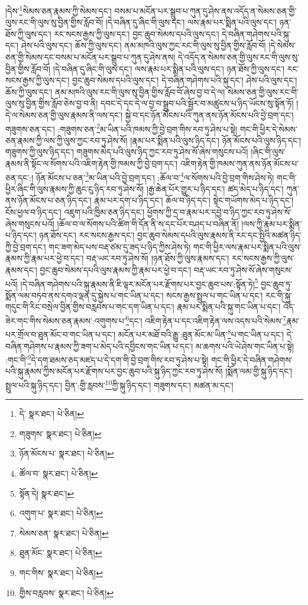 །དེས་\footnote{དེ་  སྣར་ཐང་།  པེ་ཅིན། }སེམས་ཅན་རྣམས་ཀྱི་སེམས་དང་། བསམ་པ་མངོན་པར་སྒྲུབ་པ་ཀུན་དུ་ཤེས་ནས་འདོད་ན་སེམས་ཅན་གྱི་ལུས་རང་གི་ལུས་སུ་བྱིན་གྱིས་རློབ་བོ། །དེ་བཞིན་དུ་ཞིང་གི་ལུས་དང་། ལས་རྣམ་པར་སྨིན་པའི་ལུས་དང་། ཉན་ཐོས་ཀྱི་ལུས་དང་། རང་སངས་རྒྱས་ཀྱི་ལུས་དང་། བྱང་ཆུབ་སེམས་དཔའི་ལུས་དང་། དེ་བཞིན་གཤེགས་པའི་སྐུ་དང་། ཤེས་པའི་ལུས་དང་། ཆོས་ཀྱི་ལུས་དང་། ནམ་མཁའི་ལུས་ཀྱང་རང་གི་ལུས་སུ་བྱིན་གྱིས་རློབ་བོ། །དེ་སེམས་ཅན་གྱི་སེམས་དང་བསམ་པ་མངོན་པར་སྒྲུབ་པ་ཀུན་དུ་ཤེས་ནས། དེ་འདོད་ན་སེམས་ཅན་གྱི་ལུས་རང་གི་ལུས་སུ་བྱིན་གྱིས་རློབ་བོ། །དེ་བཞིན་དུ་ཞིང་གི་ལུས་དང་། ལས་རྣམ་པར་སྨིན་པའི་ལུས་དང་། ཉན་ཐོས་ཀྱི་ལུས་དང་། རང་སངས་རྒྱས་ཀྱི་ལུས་དང་། བྱང་ཆུབ་སེམས་དཔའི་ལུས་དང་། དེ་བཞིན་གཤེགས་པའི་སྐུ་དང་། ཤེས་པའི་ལུས་དང་། ཆོས་ཀྱི་ལུས་དང་། ནམ་མཁའི་ལུས་རང་གི་ལུས་སུ་བྱིན་གྱིས་རློབ་བོ་ཞེས་བྱ་བ་དེ་ལ། སེམས་ཅན་གྱི་ལུས་རང་གི་ལུས་སུ་བྱིན་གྱིས་རློབ་ཅེས་བྱ་བ་ནི། དབང་དེ་དང་དེ་ལ་བྱ་བ་སྒྲུབ་པའི་སྦྱོར་བ་མཚུངས་པ་ཉིད་ཡོངས་སུ་སྟོན་ཏོ། །དེ་ལ་སེམས་ཅན་གྱི་ལུས་རྣམས་ནི་ལས་དང་། སྐྱེ་བ་དང་ཉོན་མོངས་པའི་ཀུན་ནས་ཉོན་མོངས་པའི་བྱེ་བྲག་དང་། གཟུགས་ཅན་དང་། :གཟུགས་ཅན་\footnote{གཟུགས་  སྣར་ཐང་།  པེ་ཅིན། }མ་ཡིན་པའི་ཁམས་ཀྱི་བྱེ་བྲག་གིས་རབ་ཏུ་ཤེས་པ་སྟེ། གང་གི་ཕྱིར་དེ་སེམས་ཅན་རྣམས་ཀྱི་ལས་ཀྱི་ལུས་ཀྱང་རབ་ཏུ་ཤེས་སོ། །རྣམ་པར་སྨིན་པའི་ལུས་ཉིད་དང་། ཉོན་མོངས་པའི་ལུས་ཉིད་དང་། གཟུགས་ཀྱི་ལུས་ཉིད་དང་། གཟུགས་མེད་པའི་ལུས་ཉིད་ཀྱང་རབ་ཏུ་ཤེས་སོ་ཞེས་གསུངས་པའོ། །ཞིང་གི་ལུས་རྣམས་ནི་སྟོང་ལ་སོགས་པའི་འཇིག་རྟེན་གྱི་ཁམས་ཀྱི་བྱེ་བྲག་དང་། འཇིག་རྟེན་གྱི་ཁམས་ཀུན་ནས་ཉོན་མོངས་པ་ཅན་དང་:། ཉོན་མོངས་པ་ཅན་\footnote{ཉོན་མོངས་པ་  སྣར་ཐང་།  པེ་ཅིན། }མ་ཡིན་པའི་བྱེ་བྲག་དང་། :ཆོལ་བ་\footnote{ཚོལ་བ་  སྣར་ཐང་།  པེ་ཅིན། }ལ་སོགས་པའི་བྱེ་བྲག་གིས་ཤེས་ཏེ། གང་གི་ཕྱིར་ཞིང་གི་ལུས་རྣམས་ཀྱི་ཆུང་ངུ་ཉིད་རབ་ཏུ་ཤེས་སོ། །རྒྱ་ཆེན་པོར་གྱུར་པ་ཉིད་དང་། ཚད་མེད་པ་ཉིད་དང་། ཀུན་ནས་ཉོན་མོངས་པ་ཅན་ཉིད་དང་། རྣམ་པར་དག་པ་ཉིད་དང་། ཆོལ་བ་ཉིད་དང་། སྟེང་གཡོགས་མེད་པ་ཉིད་དང་། ངོས་ཕྱལ་བ་ཉིད་དང་། འཇུག་པའི་ཁྱིམ་ཅན་ཉིད་དང་། ཕྱོགས་ཀྱི་དྲ་བ་རྣམ་པར་དབྱེ་བ་ཉིད་ཀྱང་རབ་ཏུ་ཤེས་སོ་ཞེས་གསུངས་པའོ། །ཆོལ་བ་ལ་སོགས་པའི་ཚིག་གི་དོན་ནི་ས་དང་པོར་བཤད་པ་བཞིན་ནོ། །ལས་ཀྱི་རྣམ་པར་སྨིན་པ་ཉིད་དང་། ཉན་ཐོས་དང་། རང་སངས་རྒྱས་དང་། བྱང་ཆུབ་སེམས་དཔའི་ལུས་རྣམས་ནི་རང་དང་སྤྱིའི་མཚན་ཉིད་ཀྱི་བྱེ་བྲག་དང་། གང་ཟག་མེད་པས་བརྡ་ཙམ་དུ་ཟད་པ་ཉིད་ཀྱིས་ཤེས་ཏེ། གང་གི་ཕྱིར་ལས་རྣམ་པར་སྨིན་པའི་ལུས་རྣམས་ཀྱི་རྣམ་པར་ཕྱེ་བ་དང་། བརྡ་ཡང་རབ་ཏུ་ཤེས་སོ། །ཉན་ཐོས་ཀྱི་ལུས་རྣམས་དང་། རང་སངས་རྒྱས་ཀྱི་ལུས་རྣམས་དང་། བྱང་ཆུབ་སེམས་དཔའི་ལུས་རྣམས་ཀྱི་རྣམ་པར་ཕྱེ་བ་དང་། བརྡ་ཡང་རབ་ཏུ་ཤེས་སོ་ཞེས་གསུངས་པའོ། །དེ་བཞིན་གཤེགས་པའི་སྐུ་རྣམས་ནི་ཇི་ལྟར་མངོན་པར་རྫོགས་པར་བྱང་ཆུབ་པས་:སྟོན་ཏེ།\footnote{སྟོན་དེ།  སྣར་ཐང་། } བྱང་ཆུབ་ཏུ་སྨོན་ལམ་བཏབ་ནས་དགའ་ལྡན་དུ་སྐྱེས་པ་གང་ཡིན་པ་དང་། སངས་རྒྱས་སྤྲུལ་པ་གང་ཡིན་པ་དང་། རང་གི་སྐུ་གདུང་གི་རིང་བསྲེལ་བྱིན་གྱིས་བརླབས་པ་གང་དག་ཡིན་པ་དང་། རྣམ་པར་སྨིན་པའི་སྐུ་གང་ཡིན་པ་དང་། འོད་ཟེར་གང་གིས་སེམས་ཅན་རྣམས་:འགུགས་པ་\footnote{འགུག་པ་  སྣར་ཐང་།  པེ་ཅིན། }དང་། འཇིག་རྟེན་པ་དང་འཇིག་རྟེན་ལས་འདས་པའི་སེམས་\footnote{སེམས་ཅན་  སྣར་ཐང་།  པེ་ཅིན། }རྣམ་པར་གྲོལ་བ་ཐུན་མོང་བ་གང་ཡིན་པ་དང་། མངོན་པར་མཐོ་བའི་རྒྱུ་:ཐུན་མོང་མ་ཡིན་\footnote{ཐུན་མོང་  སྣར་ཐང་།  པེ་ཅིན། }པ་གང་ཡིན་པ་དང་། དེ་བཞིན་གཤེགས་པ་རྣམས་ཀྱི་ཟག་པ་མེད་པའི་དབྱིངས་གང་ཡིན་པ་དང་། མ་ཆགས་པའི་ཡེ་ཤེས་གང་ཡིན་པ་སྟེ། :གང་གི་\footnote{གང་གིས་  སྣར་ཐང་།  པེ་ཅིན། }དེ་དག་ཐམས་ཅད་མཛད་པ་དེ་དག་གི་བྱེ་བྲག་གིས་རབ་ཏུ་ཤེས་པ་སྟེ། གང་གི་ཕྱིར་དེ་བཞིན་གཤེགས་པའི་སྐུ་རྣམས་ཀྱིས་མངོན་པར་རྫོགས་པར་བྱང་ཆུབ་པའི་སྐུ་ཉིད་ཀྱང་རབ་ཏུ་ཤེས་སོ། །སྨོན་ལམ་གྱི་སྐུ་ཉིད་དང་། སྤྲུལ་པའི་སྐུ་ཉིད་དང་། བྱིན་:གྱི་རླབས་\footnote{གྱིས་བརླབས་  སྣར་ཐང་།  པེ་ཅིན། }ཀྱི་སྐུ་ཉིད་དང་། གཟུགས་དང་། མཚན་མ་དང་། 